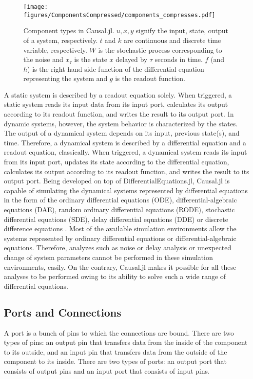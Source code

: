\documentclass{juliacon}
\begin{document}
\begin{figure}
    \centering
    \texttt{[image: figures/ComponentsCompressed/components\_compresses.pdf]}
    \caption{Component types in Causal.jl. $u, x, y$ signify the input, state, output of a system, respectively. $t$ and $k$ are continuous and discrete time variable, respectively. $W$ is the stochastic process corresponding to the noise and $x_\tau$ is the state $x$ delayed by $\tau$ seconds in time. $f$ (and $h$) is the right-hand-side function of the differential equation representing the system and $g$ is the readout function.}
    \label{fig: component types}
\end{figure}

A static system is described by a readout equation solely. When triggered, a static system reads its input data from its input port, calculates its output according to its readout function, and writes the result to its output port. In dynamic systems, however, the system behavior is characterized by the states. The output of a dynamical system depends on its input, previous state(s), and time. Therefore, a dynamical system is described by a differential equation and a readout equation, classically. When triggered, a dynamical system reads its input from its input port, updates its state according to the differential equation, calculates its output according to its readout function, and writes the result to its output port. Being developed on top of DifferentialEquations.jl, Causal.jl is capable of simulating the dynamical systems represented by differential equations in the form of the ordinary differential equations (ODE), differential-algebraic equations (DAE), random ordinary differential equations (RODE), stochastic differential equations (SDE), delay differential equations (DDE) or discrete difference equations \cite{rackauckas2017differentialequations}. Most of the available simulation environments allow the systems represented by ordinary differential equations or differential-algebraic equations\cite{elmqvist1978structured,nytsch2006advanced,zimmer2008introducing,mosterman2002hybrsim,van2001variables,giorgidze2009higher,pfeiffer2012pysimulator,simulink}. Therefore, analyzes such as noise or delay analysis or unexpected change of system parameters cannot be performed in these simulation environments, easily. On the contrary, Causal.jl makes it possible for all these analyses to be performed owing to its ability to solve such a wide range of differential equations.

\subsection{Ports and Connections}
A port is a bunch of pins to which the connections are bound. There are two types of pins: an output pin that transfers data from the inside of the component to its outside, and an input pin that transfers data from the outside of the component to its inside. There are two types of ports: an output port that consists of output pins and an input port that consists of input pins.
\end{document}
